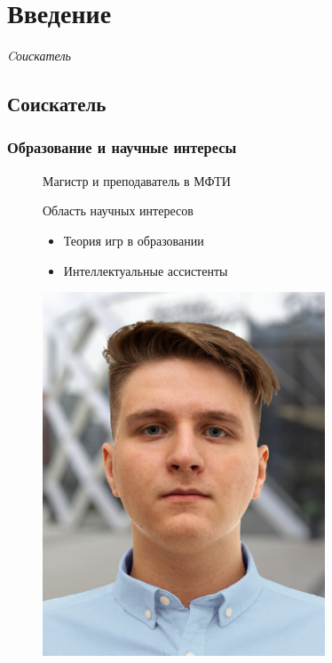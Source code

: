 \section{Введение}

\begin{frame}
    \centering \Large
  \emph{Cоискатель}
\end{frame}

\subsection{Соискатель}

\begin{frame}
    \frametitle{Образование и научные интересы}
    \begin{figure}
        \begin{minipage}[b]{0.45\linewidth}
            \centering
            Магистр и преподаватель в МФТИ 
            \begin{block}{Область научных интересов}
                \begin{itemize}
                    \item Теория игр в образовании
                    \item Интеллектуальные ассистенты 
                \end{itemize}
            \end{block}
        \end{minipage}
        \hspace{0.5cm}
        \begin{minipage}[b]{0.45\linewidth}
            \centering
            \includegraphics[width=0.45\linewidth]{assets/MashalovNE.png}
        \end{minipage}
    \end{figure}
\end{frame}


